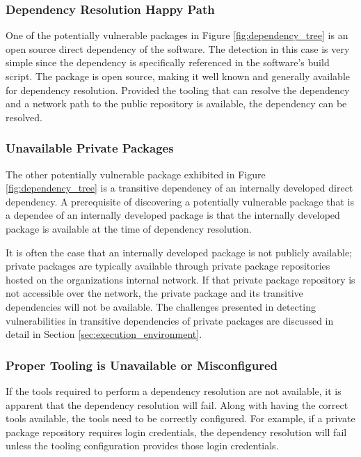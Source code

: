 \subsubsection{Dependency Resolution Happy Path}

One of the potentially vulnerable packages in Figure \ref{fig:dependency_tree} 
is an open source direct dependency of the software.  The detection in this
case is very simple since the dependency is specifically referenced in
the software's build script.  The package is open source, making it well known
and generally available for dependency resolution. Provided the tooling that
can resolve the dependency and a network path to the public repository
is available, the dependency can be resolved.


\subsubsection{Unavailable Private Packages}

The other potentially vulnerable package exhibited in Figure 
\ref{fig:dependency_tree} is a transitive dependency of an internally 
developed direct dependency. A prerequisite of discovering a potentially 
vulnerable package that is a dependee of an internally developed package
is that the internally developed package is available at the time of 
dependency resolution.  

It is often the case that an 
internally developed package is not publicly
available; private packages are typically available through private
package repositories hosted on the organizations internal network.
If that private package repository is not accessible over the network,
the private package and its transitive dependencies will not be available.
The challenges presented in detecting vulnerabilities 
in transitive dependencies of private packages are discussed in detail
in Section \ref{sec:execution_environment}.

\subsubsection{Proper Tooling is Unavailable or Misconfigured}

If the tools required to perform a dependency resolution are not available,
it is apparent that the dependency resolution will fail.  Along with
having the correct tools available, the tools need to be correctly configured.
For example, if a private package repository requires login credentials, 
the dependency resolution will fail unless the tooling configuration provides
those login credentials.

